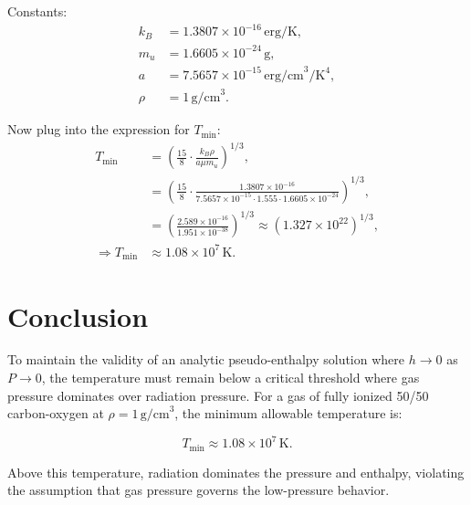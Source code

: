 \documentclass[12pt]{article}
\begin{document}
Constants:
\begin{align*}
    k_B &= 1.3807 \times 10^{-16} \, \text{erg/K}, \\
    m_u &= 1.6605 \times 10^{-24} \, \text{g}, \\
    a   &= 7.5657 \times 10^{-15} \, \text{erg/cm}^3/\text{K}^4, \\
    \rho &= 1 \, \text{g/cm}^3.
\end{align*}

Now plug into the expression for \( T_{\min} \):
\begin{align}
    T_{\min} &= \left( \frac{15}{8} \cdot \frac{k_B \rho}{a \mu m_u} \right)^{1/3}, \\
    &= \left( \frac{15}{8} \cdot \frac{1.3807 \times 10^{-16}}{7.5657 \times 10^{-15} \cdot 1.555 \cdot 1.6605 \times 10^{-24}} \right)^{1/3}, \\
    &= \left( \frac{2.589 \times 10^{-16}}{1.951 \times 10^{-38}} \right)^{1/3}
    \approx \left( 1.327 \times 10^{22} \right)^{1/3}, \\
    \Rightarrow T_{\min} &\approx \boxed{1.08 \times 10^7 \, \text{K}}.
\end{align}

\section*{Conclusion}

To maintain the validity of an analytic pseudo-enthalpy solution where \( h \to 0 \) as \( P \to 0 \), the temperature must remain below a critical threshold where gas pressure dominates over radiation pressure. For a gas of fully ionized 50/50 carbon-oxygen at \( \rho = 1 \, \text{g/cm}^3 \), the minimum allowable temperature is:

\[
\boxed{T_{\min} \approx 1.08 \times 10^7 \, \text{K}}.
\]

Above this temperature, radiation dominates the pressure and enthalpy, violating the assumption that gas pressure governs the low-pressure behavior.
\end{document}
